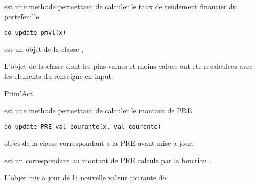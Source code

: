 \documentclass[a4paper]{book}
\begin{document}
%
\begin{Description}\relax
{} est une methode permettant de calculer le taux de rendement financier du portefeuille.
\end{Description}
%
\begin{Usage}
\begin{verbatim}
do_update_pmvl(x)
\end{verbatim}
\end{Usage}
%
\begin{Arguments}
\begin{ldescription}
\item[\code{x}] est un objet de la classe ,
\end{ldescription}
\end{Arguments}
%
\begin{Value}
L'objet  de la classe  dont les plus values et moins values ont ete recalculees avec les elements du  renseigne en input.
\end{Value}
%
\begin{Author}\relax
Prim'Act
\end{Author}
%
\begin{Description}\relax
{} est une methode permettant de calculer le montant de PRE.
\end{Description}
%
\begin{Usage}
\begin{verbatim}
do_update_PRE_val_courante(x, val_courante)
\end{verbatim}
\end{Usage}
%
\begin{Arguments}
\begin{ldescription}
\item[\code{x}] objet de la classe correspondant a la PRE avant mise a jour.

\item[\code{val\_courante}] est un  correspondant au montant de PRE calcule par la fonction .
\end{ldescription}
\end{Arguments}
%
\begin{Value}
L'objet  mis a jour de la nouvelle valeur courante de 
\end{Value}
\end{document}
